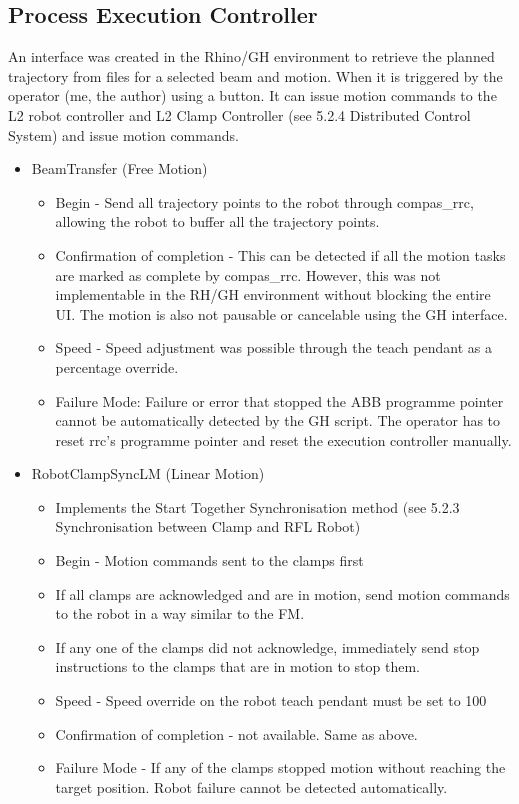 \begin{itemize}
\begin{enumerate}
\subsection{Process Execution Controller}
An interface was created in the Rhino/GH environment to retrieve the planned trajectory from files for a selected beam and motion. When it is triggered by the operator (me, the author) using a button. It can issue motion commands to the L2 robot controller and L2 Clamp Controller (see 5.2.4 Distributed Control System) and issue motion commands. 
\begin{itemize}
\item BeamTransfer (Free Motion)
    \begin{itemize}
    \item Begin - Send all trajectory points to the robot through compas_rrc, allowing the robot to buffer all the trajectory points. 
    \item Confirmation of completion  -  This can be detected if all the motion tasks are marked as complete by compas_rrc. However, this was not implementable in the RH/GH environment without blocking the entire UI. The motion is also not pausable or cancelable using the GH interface.
    \item Speed - Speed adjustment was possible through the teach pendant as a percentage override.
    \item Failure Mode: Failure or error that stopped the ABB programme pointer cannot be automatically detected by the GH script. The operator has to reset rrc’s programme pointer and reset the execution controller manually.
    \end{itemize}
\item RobotClampSyncLM (Linear Motion)
    \begin{itemize}
    \item Implements the Start Together Synchronisation method (see 5.2.3 Synchronisation between Clamp and RFL Robot)
    \item Begin - Motion commands sent to the clamps first
    \end{itemize}
        \begin{itemize}
        \item If all clamps are acknowledged and are in motion, send motion commands to the robot in a way similar to the FM.
    \item If any one of the clamps did not acknowledge, immediately send stop instructions to the clamps that are in motion to stop them. 
    \end{itemize}
    \begin{itemize}
    \item Speed - Speed override on the robot teach pendant must be set to 100%
    \item Confirmation of completion - not available. Same as above.
    \item Failure Mode - If any of the clamps stopped motion without reaching the target position. Robot failure cannot be detected automatically.
    \end{itemize}
\end{itemize}


\end{enumerate}
\end{itemize}

